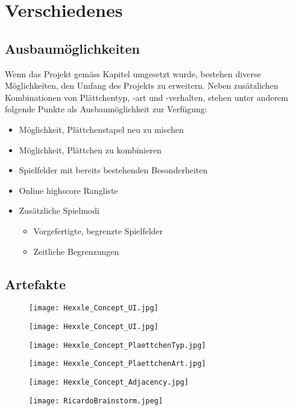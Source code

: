 \documentclass[../main.tex]{subfiles}
\begin{document}
	\section{Verschiedenes}
	
	\subsection{Ausbaumöglichkeiten}
	\par Wenn das Projekt gemäss Kapitel  umgesetzt wurde, bestehen diverse Möglichkeiten, den Umfang des Projekts zu erweitern. Neben zusätzlichen Kombinationen von Plättchentyp, -art und -verhalten, stehen unter anderem folgende Punkte als Ausbaumöglichkeit zur Verfügung:
	\begin{itemize}
		\item Möglichkeit, Plättchenstapel neu zu mischen
		\item Möglichkeit, Plättchen zu kombinieren
		\item Spielfelder mit bereits bestehenden Besonderheiten
		\item Online \gls{highscore} Rangliste
		\item Zusätzliche Spielmodi
		\begin{itemize}
			\item Vorgefertigte, begrenzte Spielfelder
			\item Zeitliche Begrenzungen
		\end{itemize}
	\end{itemize}

	\subsection{Artefakte}
	
	\begin{figure}[H]
		\centering
		\texttt{[image: Hexxle\_Concept\_UI.jpg]}
		\caption{}
	\end{figure}

	\begin{figure}[H]
		\centering
		\texttt{[image: Hexxle\_Concept\_UI.jpg]}
		\caption{}
	\end{figure}

	\begin{figure}[H]
		\centering
		\texttt{[image: Hexxle\_Concept\_PlaettchenTyp.jpg]}
		\caption{}
	\end{figure}

	\begin{figure}[H]
		\centering
		\texttt{[image: Hexxle\_Concept\_PlaettchenArt.jpg]}
		\caption{}
	\end{figure}

	\begin{figure}[H]
		\centering
		\texttt{[image: Hexxle\_Concept\_Adjacency.jpg]}
		\caption{}
	\end{figure}

	\begin{figure}[H]
		\centering
		\texttt{[image: RicardoBrainstorm.jpeg]}
		\caption{}
	\end{figure}
\end{document}
